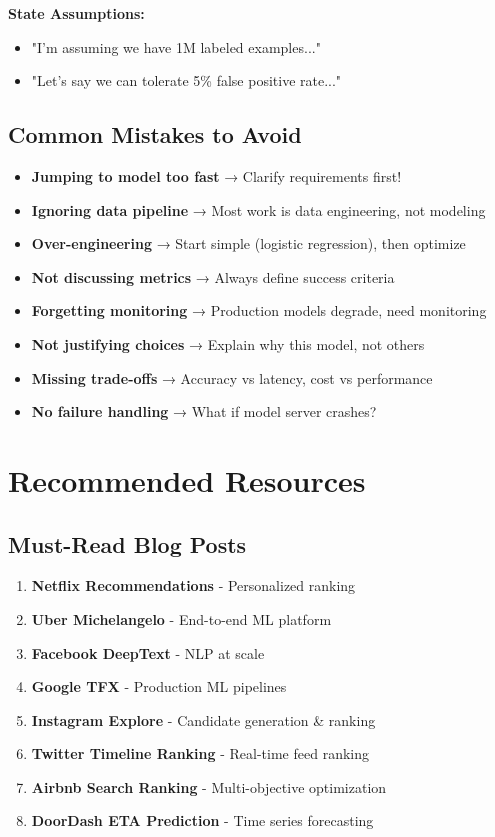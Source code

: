 \documentclass[10pt]{article}
\begin{document}
\textbf{State Assumptions:}
\begin{itemize}
\item "I'm assuming we have 1M labeled examples..."
\item "Let's say we can tolerate 5\% false positive rate..."
\end{itemize}

\subsection{Common Mistakes to Avoid}

\begin{itemize}
\item \textbf{Jumping to model too fast} → Clarify requirements first!
\item \textbf{Ignoring data pipeline} → Most work is data engineering, not modeling
\item \textbf{Over-engineering} → Start simple (logistic regression), then optimize
\item \textbf{Not discussing metrics} → Always define success criteria
\item \textbf{Forgetting monitoring} → Production models degrade, need monitoring
\item \textbf{Not justifying choices} → Explain why this model, not others
\item \textbf{Missing trade-offs} → Accuracy vs latency, cost vs performance
\item \textbf{No failure handling} → What if model server crashes?
\end{itemize}

\section{Recommended Resources}

\subsection{Must-Read Blog Posts}

\begin{enumerate}
\item \textbf{Netflix Recommendations} - Personalized ranking
\item \textbf{Uber Michelangelo} - End-to-end ML platform
\item \textbf{Facebook DeepText} - NLP at scale
\item \textbf{Google TFX} - Production ML pipelines
\item \textbf{Instagram Explore} - Candidate generation \& ranking
\item \textbf{Twitter Timeline Ranking} - Real-time feed ranking
\item \textbf{Airbnb Search Ranking} - Multi-objective optimization
\item \textbf{DoorDash ETA Prediction} - Time series forecasting
\end{enumerate}
\end{document}
